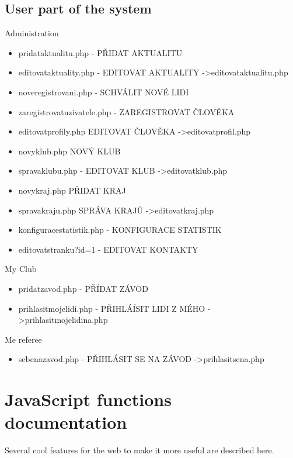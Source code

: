 \subsection*{User part of the system} 
Administration
\begin{itemize}
    \item pridat\textunderscore aktualitu.php - PŘIDAT AKTUALITU 
    \item editovat\textunderscore aktuality.php - EDITOVAT AKTUALITY -\textgreater editovat\textunderscore aktualitu.php
    \item nove\textunderscore registrovani.php - SCHVÁLIT NOVÉ LIDI 
    \item zaregistrovat\textunderscore uzivatele.php - ZAREGISTROVAT ČLOVĚKA
    \item editovat\textunderscore profily.php EDITOVAT ČLOVĚKA -\textgreater editovat\textunderscore profil.php
    \item novy\textunderscore klub.php NOVÝ KLUB
    \item sprava\textunderscore klubu.php - EDITOVAT KLUB -\textgreater editovat\textunderscore klub.php
    \item novy\textunderscore kraj.php PŘIDAT KRAJ
    \item sprava\textunderscore kraju.php SPRÁVA KRAJŮ -\textgreater editovat\textunderscore kraj.php
    \item konfigurace\textunderscore statistik.php - KONFIGURACE STATISTIK
    \item editovat\textunderscore stranku?id=1 - EDITOVAT KONTAKTY
\end{itemize}      
My Club
\begin{itemize}
    \item pridat\textunderscore zavod.php - PŘÍDAT ZÁVOD
    \item prihlasit\textunderscore moje\textunderscore lidi.php - PŘIHLÁÍSIT LIDI Z MÉHO -\textgreater prihlasit\textunderscore moje\textunderscore lidi\textunderscore na.php
\end{itemize} 
Me referee
\begin{itemize}
    \item sebe\textunderscore na\textunderscore zavod.php - PŘIHLÁSIT SE NA ZÁVOD -\textgreater prihlasit\textunderscore se\textunderscore na.php
\end{itemize}    
\section{JavaScript functions documentation}
Several cool features for the web to make it more useful are described here.
